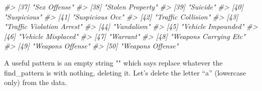 \documentclass[
  12pt,
]{book}
\newenvironment{Shaded}{\begin{snugshade}}{\end{snugshade}}
\newcommand{\CommentTok}[1]{\textcolor[rgb]{0.37,0.37,0.37}{\textit{#1}}}
\begin{document}
\begin{Shaded}
\begin{Highlighting}[]
\CommentTok{\#> [37] "Sex Offense"                               }
\CommentTok{\#> [38] "Stolen Property"                           }
\CommentTok{\#> [39] "Suicide"                                   }
\CommentTok{\#> [40] "Suspicious"                                }
\CommentTok{\#> [41] "Suspicious Occ"                            }
\CommentTok{\#> [42] "Traffic Collision"                         }
\CommentTok{\#> [43] "Traffic Violation Arrest"                  }
\CommentTok{\#> [44] "Vandalism"                                 }
\CommentTok{\#> [45] "Vehicle Impounded"                         }
\CommentTok{\#> [46] "Vehicle Misplaced"                         }
\CommentTok{\#> [47] "Warrant"                                   }
\CommentTok{\#> [48] "Weapons Carrying Etc"                      }
\CommentTok{\#> [49] "Weapons Offense"                           }
\CommentTok{\#> [50] "Weapons Offense"}
\end{Highlighting}
\end{Shaded}

A useful pattern is an empty string "" which says replace whatever the find\_pattern is with nothing, deleting it. Let's delete the letter ``a'' (lowercase only) from the data.
\end{document}
